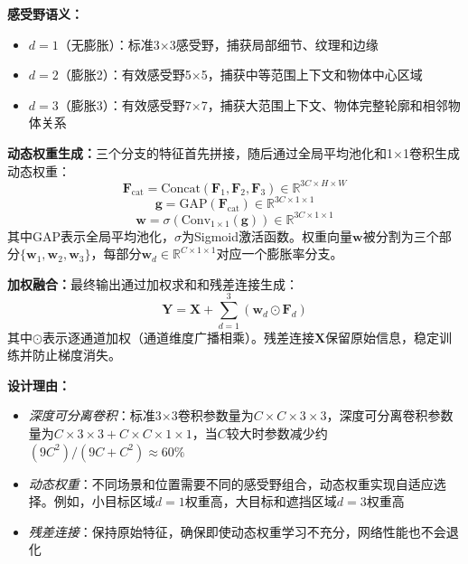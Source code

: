 \documentclass[journal]{IEEEtran}
\begin{document}
\textbf{感受野语义：}
\begin{itemize}
    \item $d=1$（无膨胀）：标准3$\times$3感受野，捕获局部细节、纹理和边缘
    \item $d=2$（膨胀2）：有效感受野5$\times$5，捕获中等范围上下文和物体中心区域
    \item $d=3$（膨胀3）：有效感受野7$\times$7，捕获大范围上下文、物体完整轮廓和相邻物体关系
\end{itemize}

\textbf{动态权重生成：}三个分支的特征首先拼接，随后通过全局平均池化和1$\times$1卷积生成动态权重：
\begin{equation}
\mathbf{F}_{\text{cat}} = \text{Concat}(\mathbf{F}_1, \mathbf{F}_2, \mathbf{F}_3) \in \mathbb{R}^{3C \times H \times W}
\end{equation}
\begin{equation}
\mathbf{g} = \text{GAP}(\mathbf{F}_{\text{cat}}) \in \mathbb{R}^{3C \times 1 \times 1}
\end{equation}
\begin{equation}
\mathbf{w} = \sigma(\text{Conv}_{1\times1}(\mathbf{g})) \in \mathbb{R}^{3C \times 1 \times 1}
\end{equation}
其中GAP表示全局平均池化，$\sigma$为Sigmoid激活函数。权重向量$\mathbf{w}$被分割为三个部分$\{\mathbf{w}_1, \mathbf{w}_2, \mathbf{w}_3\}$，每部分$\mathbf{w}_d \in \mathbb{R}^{C \times 1 \times 1}$对应一个膨胀率分支。

\textbf{加权融合：}最终输出通过加权求和和残差连接生成：
\begin{equation}
\mathbf{Y} = \mathbf{X} + \sum_{d=1}^{3} (\mathbf{w}_d \odot \mathbf{F}_d)
\end{equation}
其中$\odot$表示逐通道加权（通道维度广播相乘）。残差连接$\mathbf{X}$保留原始信息，稳定训练并防止梯度消失。

\textbf{设计理由：}
\begin{itemize}
    \item \textit{深度可分离卷积}：标准3$\times$3卷积参数量为$C \times C \times 3 \times 3$，深度可分离卷积参数量为$C \times 3 \times 3 + C \times C \times 1 \times 1$，当$C$较大时参数减少约$(9C^2) / (9C + C^2) \approx 60\%$
    \item \textit{动态权重}：不同场景和位置需要不同的感受野组合，动态权重实现自适应选择。例如，小目标区域$d=1$权重高，大目标和遮挡区域$d=3$权重高
    \item \textit{残差连接}：保持原始特征，确保即使动态权重学习不充分，网络性能也不会退化
\end{itemize}
\end{document}

